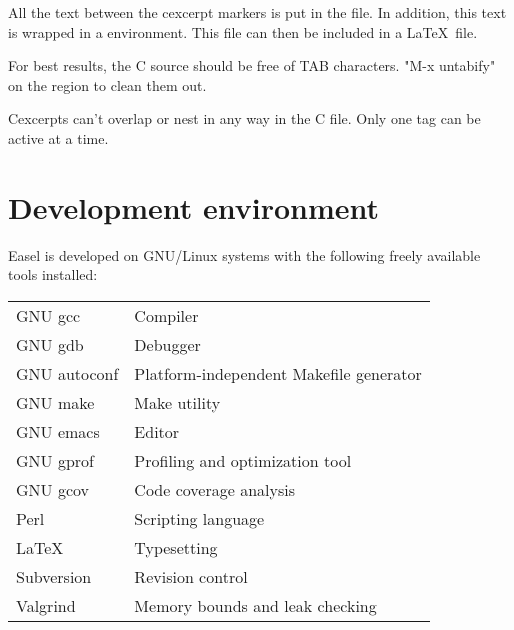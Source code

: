 All the text between the cexcerpt markers is put in the file.  In
addition, this text is wrapped in a  environment.  This
file can then be included in a \LaTeX\ file.

For best results, the C source should be free of TAB characters.
"M-x untabify" on the region to clean them out.

Cexcerpts can't overlap or nest in any way in the C file. Only one tag
can be active at a time.



\section{Development environment}

Easel is developed on GNU/Linux systems with the following freely
available tools installed:

{\small
\begin{tabular}{ll}
GNU gcc         & Compiler \\
GNU gdb         & Debugger\\
GNU autoconf    & Platform-independent Makefile generator\\
GNU make        & Make utility\\
GNU emacs       & Editor    \\
GNU gprof       & Profiling and optimization tool \\
GNU gcov        & Code coverage analysis\\
Perl            & Scripting language\\
LaTeX           & Typesetting\\
Subversion      & Revision control\\
Valgrind        & Memory bounds and leak checking\\
\end{tabular}
}



